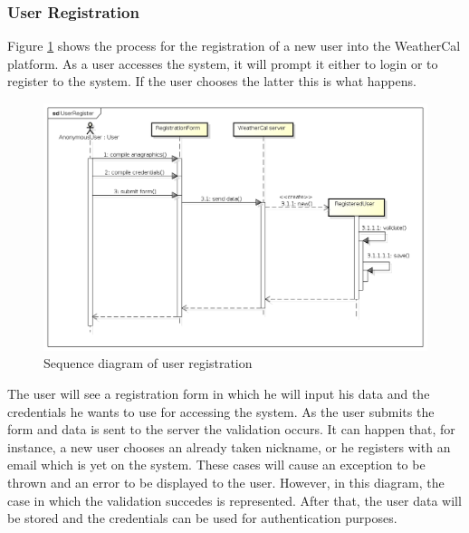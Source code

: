 \subsubsection{User Registration}
Figure \ref{fig:regseqdiag} shows the process for the registration of a new user into the WeatherCal platform. As a user accesses the system, it will prompt it either to login or to register to the system. If the user chooses the latter this is what happens.
\begin{center}
 \begin{figure}[H]
    \includegraphics[width=1\textwidth]{./UMLDiagram/sequence/UserRegister/UserRegister.png}
    \caption{Sequence diagram of user registration}
     \label{fig:regseqdiag}
     \end{figure}
   \end{center}  
The user will see a registration form in which he will input his data and the credentials he wants to use for accessing the system. As the user submits the form and data is sent to the server the validation occurs. It can happen that, for instance, a new user chooses an already taken nickname, or he registers with an email which is yet on the system. These cases will cause an exception to be thrown and an error to be displayed to the user. However, in this diagram, the case in which the validation succedes is represented. After that, the user data will be stored and the credentials can be used for authentication purposes.
\newpage

